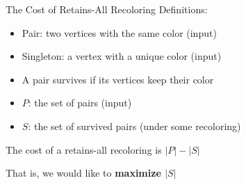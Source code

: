 \begin{frame}{The Cost of Retains-All Recoloring}
Definitions:
\begin{itemize}

\pause\item
\alert{Pair}: two vertices with the same color (input)

\pause\item
\alert{Singleton}: a vertex with a unique color (input)

\pause\item
A pair \alert{survives} if its vertices keep their color

\pause\item
\alert{$P$}: the set of pairs (input)  

\pause\item
\alert{$S$}: the set of survived pairs (under some recoloring)

\end{itemize}

\pause\begin{observation}
The cost of a retains-all recoloring is $|P| - |S|$
\end{observation}

\pause
That is, we would like to \textbf{maximize $|S|$}

\end{frame}
